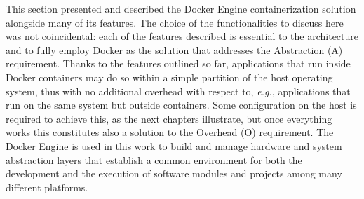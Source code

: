 This section presented and described the Docker Engine containerization solution alongside many of its features. The choice of the functionalities to discuss here was not coincidental: each of the features described is essential to the architecture and to fully employ Docker as the solution that addresses the Abstraction (A) requirement. Thanks to the features outlined so far, applications that run inside Docker containers may do so within a simple partition of the host operating system, thus with no additional overhead with respect to, \emph{e.g.}, applications that run on the same system but outside containers. Some configuration on the host is required to achieve this, as the next chapters illustrate, but once everything works this constitutes also a solution to the Overhead (O) requirement. The Docker Engine is used in this work to build and manage hardware and system abstraction layers that establish a common environment for both the development and the execution of software modules and projects among many different platforms.
